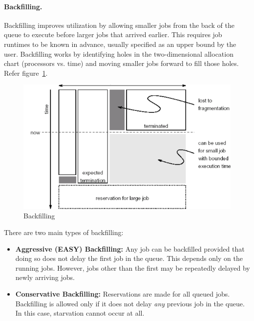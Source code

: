 \documentclass[12pt]{book}
\begin{document}
\paragraph{Backfilling.}  
Backfilling improves utilization by allowing smaller jobs from the back of the queue to execute before larger jobs that arrived earlier. This requires job runtimes to be known in advance, usually specified as an upper bound by the user. Backfilling works by identifying holes in the two-dimensional allocation chart (processors vs. time) and moving smaller jobs forward to fill those holes. Refer figure~\ref{fig:backfilling}.
\begin{figure}[ht]
    \centering
    \includegraphics[width=0.75\linewidth]{images/backfilling.png}
    \caption{Backfilling}
    \label{fig:backfilling}
\end{figure}
There are two main types of backfilling:
\begin{itemize}
    \item \textbf{Aggressive (EASY) Backfilling:} Any job can be backfilled provided that doing so does not delay the first job in the queue. This depends only on the running jobs. However, jobs other than the first may be repeatedly delayed by newly arriving jobs.
    \item \textbf{Conservative Backfilling:} Reservations are made for all queued jobs. Backfilling is allowed only if it does not delay \emph{any} previous job in the queue. In this case, starvation cannot occur at all.
\end{itemize}
\end{document}
